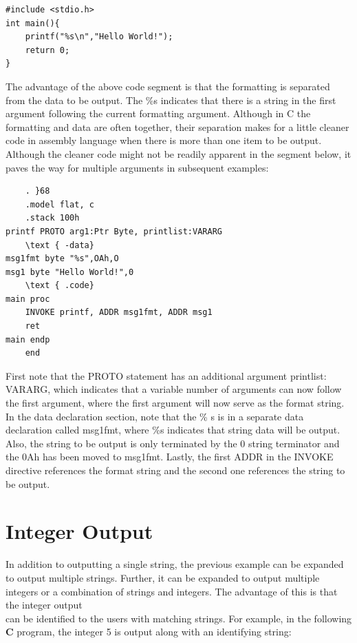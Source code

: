 \documentclass[10pt]{book}
\begin{document}
\begin{verbatim}
#include <stdio.h>
int main(){
    printf("%s\n","Hello World!");
    return 0;
}
\end{verbatim}

The advantage of the above code segment is that the formatting is separated from the data to be output. The \%s indicates that there is a string in the first argument following the current formatting argument. Although in C the formatting and data are often together, their separation makes for a little cleaner code in assembly language when there is more than one item to be output. Although the cleaner code might not be readily apparent in the segment below, it paves the way for multiple arguments in subsequent examples:


\begin{verbatim}
    . }68
    .model flat, c
    .stack 100h
printf PROTO arg1:Ptr Byte, printlist:VARARG
    \text { -data}
msg1fmt byte "%s",OAh,O
msg1 byte "Hello World!",0
    \text { .code}
main proc
    INVOKE printf, ADDR msg1fmt, ADDR msg1
    ret
main endp
    end
\end{verbatim}

First note that the PROTO statement has an additional argument printlist: VARARG, which indicates that a variable number of arguments can now follow the first argument, where the first argument will now serve as the format string. In the data declaration section, note that the \% s is in a separate data declaration called msg1fmt, where \%s indicates that string data will be output. Also, the string to be output is only terminated by the 0 string terminator and the 0Ah has been moved to msg1fmt. Lastly, the first ADDR in the INVOKE directive references the format string and the second one references the string to be output.

\section{Integer Output}
In addition to outputting a single string, the previous example can be expanded to output multiple strings. Further, it can be expanded to output multiple integers or a combination of strings and integers. The advantage of this is that the integer output\\

can be identified to the users with matching strings. For example, in the following $\mathbf{C}$ program, the integer 5 is output along with an identifying string:
\end{document}
